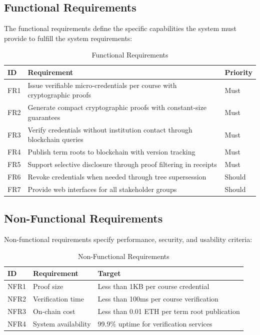 \subsection{Functional Requirements}
\label{subsec:functional-requirements}

The functional requirements define the specific capabilities the system must provide to fulfill the system requirements:

\begin{table}[H]
\centering
\caption{Functional Requirements}
\label{tab:functional-requirements}
\begin{tabular}{|p{1cm}|p{8cm}|p{2.5cm}|}
\hline
\textbf{ID} & \textbf{Requirement} & \textbf{Priority} \\
\hline
FR1 & Issue verifiable micro-credentials per course with cryptographic proofs & Must \\
\hline
FR2 & Generate compact cryptographic proofs with constant-size guarantees & Must \\
\hline
FR3 & Verify credentials without institution contact through blockchain queries & Must \\
\hline
FR4 & Publish term roots to blockchain with version tracking & Must \\
\hline
FR5 & Support selective disclosure through proof filtering in receipts & Must \\
\hline
FR6 & Revoke credentials when needed through tree supersession & Should \\
\hline
FR7 & Provide web interfaces for all stakeholder groups & Should \\
\hline
\end{tabular}
\end{table}

\subsection{Non-Functional Requirements}
\label{subsec:non-functional-requirements}

Non-functional requirements specify performance, security, and usability criteria:

\begin{table}[H]
\centering
\caption{Non-Functional Requirements}
\label{tab:non-functional-requirements}
\begin{tabular}{|p{1.5cm}|p{5cm}|p{5.5cm}|}
\hline
\textbf{ID} & \textbf{Requirement} & \textbf{Target} \\
\hline
NFR1 & Proof size & Less than 1KB per course credential \\
\hline
NFR2 & Verification time & Less than 100ms per course verification \\
\hline
NFR3 & On-chain cost & Less than 0.01 ETH per term root publication \\
\hline
NFR4 & System availability & 99.9\% uptime for verification services \\
\hline
\end{tabular}
\end{table}

